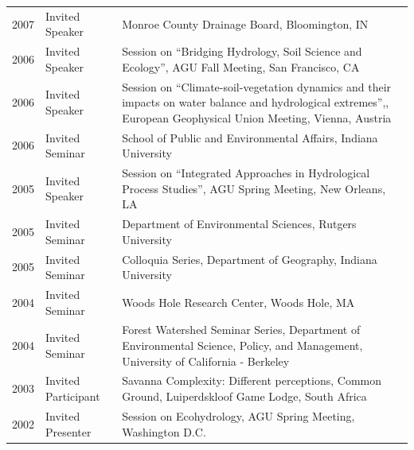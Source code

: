 \begin{longtable}{l p{3.0cm} p{11.5cm}}
2007 & Invited Speaker & Monroe County Drainage Board, Bloomington, IN \\
2006 & Invited Speaker & Session on ``Bridging Hydrology, Soil Science and Ecology'', AGU Fall Meeting, San Francisco, CA \\
2006 & Invited Speaker & Session on ``Climate-soil-vegetation dynamics and their impacts on water balance and hydrological extremes'',, European Geophysical Union Meeting, Vienna, Austria \\
2006 & Invited Seminar & School of Public and Environmental Affairs, Indiana University \\
2005 & Invited Speaker & Session on ``Integrated Approaches in Hydrological Process Studies'', AGU Spring Meeting, New Orleans, LA \\
2005 & Invited Seminar & Department of Environmental Sciences, Rutgers University \\
2005 & Invited Seminar & Colloquia Series, Department of Geography, Indiana University \\
2004 & Invited Seminar & Woods Hole Research Center, Woods Hole, MA \\
2004 & Invited Seminar & Forest Watershed Seminar Series, Department of Environmental Science, Policy, and Management, University of California - Berkeley \\
2003 & Invited Participant & Savanna Complexity: Different perceptions, Common Ground, Luiperdskloof Game Lodge, South Africa \\
2002 & Invited Presenter & Session on Ecohydrology, AGU Spring Meeting, Washington D.C. \\
\end{longtable}
